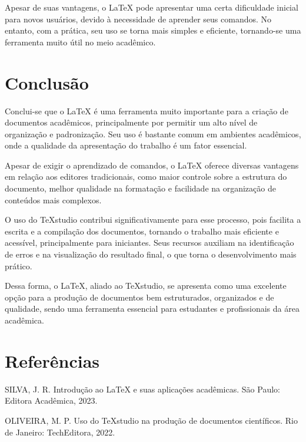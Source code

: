 \documentclass[12pt]{article}
\begin{document}
	Apesar de suas vantagens, o LaTeX pode apresentar uma certa dificuldade inicial para novos usuários, devido à necessidade de aprender seus comandos. No entanto, com a prática, seu uso se torna mais simples e eficiente, tornando-se uma ferramenta muito útil no meio acadêmico.
	
	\newpage
	
	\section{Conclusão}
	
	Conclui-se que o LaTeX é uma ferramenta muito importante para a criação de documentos acadêmicos, principalmente por permitir um alto nível de organização e padronização. Seu uso é bastante comum em ambientes acadêmicos, onde a qualidade da apresentação do trabalho é um fator essencial.
	
	Apesar de exigir o aprendizado de comandos, o LaTeX oferece diversas vantagens em relação aos editores tradicionais, como maior controle sobre a estrutura do documento, melhor qualidade na formatação e facilidade na organização de conteúdos mais complexos.
	
	O uso do TeXstudio contribui significativamente para esse processo, pois facilita a escrita e a compilação dos documentos, tornando o trabalho mais eficiente e acessível, principalmente para iniciantes. Seus recursos auxiliam na identificação de erros e na visualização do resultado final, o que torna o desenvolvimento mais prático.
	
	Dessa forma, o LaTeX, aliado ao TeXstudio, se apresenta como uma excelente opção para a produção de documentos bem estruturados, organizados e de qualidade, sendo uma ferramenta essencial para estudantes e profissionais da área acadêmica.
	
	\newpage
	
	\section*{Referências}
	
	SILVA, J. R. Introdução ao LaTeX e suas aplicações acadêmicas. São Paulo: Editora Acadêmica, 2023.
	
	OLIVEIRA, M. P. Uso do TeXstudio na produção de documentos científicos. Rio de Janeiro: TechEditora, 2022.
	
\end{document}
